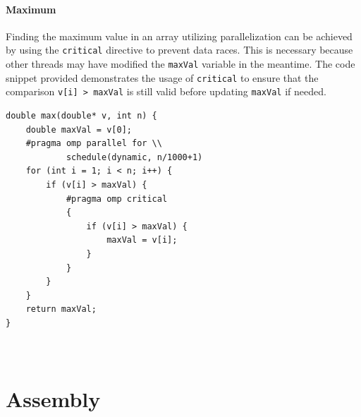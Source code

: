 \documentclass{article}
\begin{document}
\paragraph{Maximum}
Finding the maximum value in an array utilizing parallelization can be achieved by using the \lstinline|critical| directive to prevent data races. This is necessary because other threads may have modified the \lstinline|maxVal| variable in the meantime. The code snippet provided demonstrates the usage of \lstinline|critical| to ensure that the comparison \lstinline|v[i] > maxVal| is still valid before updating \lstinline|maxVal| if needed.
\begin{verbatim}
double max(double* v, int n) {
    double maxVal = v[0];
    #pragma omp parallel for \\
            schedule(dynamic, n/1000+1)
    for (int i = 1; i < n; i++) {
        if (v[i] > maxVal) {
            #pragma omp critical
            {
                if (v[i] > maxVal) {
                    maxVal = v[i];
                }
            }
        }
    }
    return maxVal;
}



\end{verbatim}
\section{Assembly}
\end{document}
